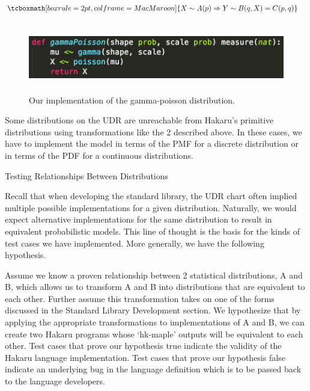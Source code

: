 \documentclass[22pt]{beamer}
\newenvironment{variableblock}[3]{%
  \setbeamercolor{block body}{#2}
  \setbeamercolor{block title}{#3}
  \begin{block}{#1}}{\end{block}}
\begin{document}
\begin{frame}[fragile]
\begin{textblock}{5}
\begin{variableblock}{}{}{}
\begin{equation*}
\begin{aligned}
& \tcboxmath[boxrule=2pt,colframe=MacMaroon]{X \sim A(p) \Rightarrow Y \sim B(q, X) = C(p, q)}
\end{aligned}
\end{equation*}

\begin{figure}
\centering
\includegraphics[height=3cm]{gamma-poisson.png}
\caption{\tiny{Our implementation of the gamma-poisson distribution.}}
\end{figure}

\bigskip

Some distributions on the UDR are unreachable from Hakaru's primitive distributions using transformations like the 2 described above. In these cases, we have to implement the model in terms of the PMF for a discrete distribution or in terms of the PDF for a continuous distributions. 


\end{variableblock}


\begin{block}{Testing Relationships Between Distributions}
\justifying

\tiny{Recall that when developing the standard library, the UDR chart often implied multiple possible implementations for a given distribution. Naturally, we would expect alternative implementations for the same distribution to result in equivalent probabilistic models. This line of thought is the basis for the kinds of test cases we have implemented. More generally, we have the following hypothesis.}

\bigskip

\tiny{Assume we know a proven relationship between 2 statistical distributions, A and B, which allows us to transform A and B into distributions that are equivalent to each other. Further assume this transformation takes on one of the forms discussed in the Standard Library Development section. We hypothesize that by applying the appropriate transformations to implementations of A and B, we can create two Hakaru programs whose `hk-maple' outputs will be equivalent to each other. Test cases that prove our hypothesis true indicate the validity of the Hakaru language implementation. Test cases that prove our hypothesis false indicate an underlying bug in the language definition which is to be passed back to the language developers.
}


\end{block}
\end{textblock}
\end{frame}
\end{document}

